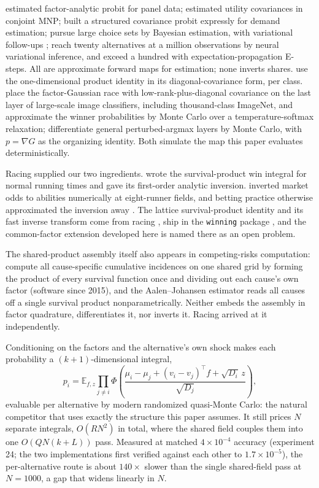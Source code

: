 \documentclass[12pt]{article}
\theoremstyle{remark}
\newcommand{\E}{\mathbb{E}}
\begin{document}
\citet{elrod1995}
estimated factor-analytic probit for panel data;
\citet{haaijer1998} estimated utility covariances in conjoint MNP;
\citet{cohen2010} built a structured covariance probit expressly for
demand estimation;
\citet{loaiza2022} pursue large choice sets by
Bayesian estimation, with variational follow-ups \citep{loaiza2023};
\citet{kim2026} reach twenty alternatives at a million observations by
neural variational inference, and \citet{ding2024} exceed a hundred with
expectation-propagation E-steps. All are approximate forward maps for
estimation; none inverts shares. \citet{girolami2006} use the
one-dimensional product identity in its diagonal-covariance form,
per class. \citet{collier2021} place the factor-Gaussian race with
low-rank-plus-diagonal covariance on the last layer of large-scale image
classifiers, including thousand-class ImageNet, and approximate the
winner probabilities by Monte Carlo over a temperature-softmax
relaxation; \citet{berthet2020} differentiate general perturbed-argmax
layers by Monte Carlo, with $p = \nabla G$ as the organizing identity.
Both simulate the map this paper evaluates deterministically.

Racing supplied our two ingredients. \citet{henery1981} wrote the
survival-product win integral for normal running times and gave its
first-order analytic inversion. \citet{ali1998} inverted market odds to
abilities numerically at eight-runner fields, and betting practice
otherwise approximated the inversion away \citep{lo1994}. The lattice survival-product identity and
its fast inverse transform come from racing \citep{cotton2021}, ship in
the \texttt{winning} package \citep{winningpkg}, and the common-factor
extension developed here is named there as an open problem.

The shared-product assembly itself also appears in competing-risks
computation: \citet{mahani2019} compute all cause-specific cumulative
incidences on one shared grid by forming the product of every survival
function once and dividing out each cause's own factor (software since
2015), and the Aalen--Johansen estimator \citep{aalen1978} reads all
causes off a single survival product nonparametrically. Neither embeds
the assembly in factor quadrature, differentiates it, nor inverts it.
Racing arrived at it independently.

Conditioning on the factors and the alternative's own shock makes each
probability a $(k{+}1)$-dimensional integral,
\[
p_i = \E_{f,z} \prod_{j \ne i}
\Phi\!\left(\frac{\mu_i - \mu_j + (v_i - v_j)^\top f +
\sqrt{D_i}\,z}{\sqrt{D_j}}\right),
\]
evaluable per alternative by modern randomized quasi-Monte Carlo: the
natural competitor that uses exactly the structure this paper assumes. It
still prices $N$ separate integrals, $O(RN^2)$ in total, where the shared
field couples them into one $O(QN(k+L))$ pass. Measured at matched
$4\times10^{-4}$ accuracy (experiment 24; the two implementations first
verified against each other to $1.7\times10^{-5}$), the per-alternative
route is about $140\times$ slower than the single shared-field pass at
$N = 1000$, a gap that widens linearly in $N$.
\end{document}
